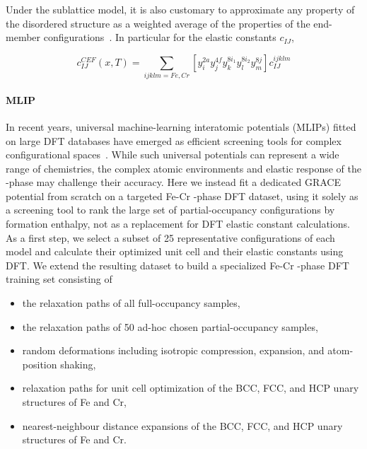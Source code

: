 \documentclass[superscriptaddress, 12pt]{revtex4-2}%
\begin{document}
Under the sublattice model, it is also customary to approximate any property of the disordered structure as a weighted average of the properties of the end-member configurations~\cite{dupin_using_2006}.
In particular for the elastic constants $c_{IJ}$, 

\begin{equation}\label{cefcij}
  c_{IJ}^{CEF} (x, T) = \sum_{i j k l m = Fe, Cr} {}
  \left[  
    y_i^{2a} y_j^{4f} y_k^{8i_1} y_l ^{8i_2} y_m ^{8j}
\right] c_{IJ} ^{i j k l m}
\end{equation}

\paragraph{MLIP}

In recent years, universal machine-learning interatomic potentials (MLIPs) fitted on large DFT databases have emerged as efficient screening tools for complex configurational spaces~\cite{lit_2022_06_vazquez_acta_materialia,lit_2025_01_bijjala_acta_materialia}.
While such universal potentials can represent a wide range of chemistries, the complex atomic environments and elastic response of the \textsigma-phase may challenge their accuracy.
Here we instead fit a dedicated GRACE~\cite{bochkarev_grace_2024} potential from scratch on a targeted Fe-Cr \textsigma-phase DFT dataset, using it solely as a screening tool to rank the large set of partial-occupancy configurations by formation enthalpy, not as a replacement for DFT elastic constant calculations.
As a first step, we select a subset of 25 representative configurations of each model and calculate their optimized unit cell and their elastic constants using DFT. 
We extend the resulting dataset to build a specialized Fe-Cr \textsigma-phase DFT training set consisting of 

\begin{itemize}
	\item the relaxation paths of all full-occupancy samples,
	\item the relaxation paths of 50 ad-hoc chosen partial-occupancy samples,
	\item random deformations including isotropic compression, expansion, and atom-position shaking, 
	\item relaxation paths for unit cell optimization of the BCC, FCC, and HCP unary structures of Fe and Cr, 
	\item nearest-neighbour distance expansions of the BCC, FCC, and HCP unary structures of Fe and Cr.
\end{itemize}
\end{document}
